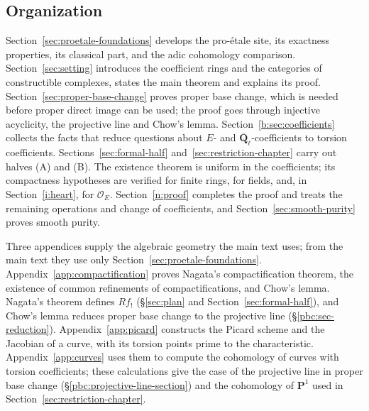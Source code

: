\documentclass[11pt,a4paper]{article}
\numberwithin{equation}{section}
\theoremstyle{definition}
\theoremstyle{remark}
\newcommand{\Qbar}{\overline{\mathbf Q}_\ell}
\newcommand{\PP}{\mathbf P}
\begin{document}
\subsection{Organization}
Section~\ref{sec:proetale-foundations} develops the pro-\'etale site,
its exactness properties, its classical part, and the adic cohomology
comparison. Section~\ref{sec:setting} introduces the coefficient rings
and the categories of constructible complexes, states the main theorem
and explains its proof. Section~\ref{sec:proper-base-change} proves
proper base change, which is needed before proper direct image can be
used; the proof goes through injective acyclicity, the projective line
and Chow's lemma. Section~\ref{b:sec:coefficients} collects the facts
that reduce questions about $E$- and $\Qbar$-coefficients to torsion
coefficients. Sections~\ref{sec:formal-half}
and~\ref{sec:restriction-chapter} carry out halves (A) and (B).
The existence theorem is uniform in the coefficients; its compactness
hypotheses are verified for finite rings, for fields, and, in
Section~\ref{i:heart}, for $\mathcal O_E$.
Section~\ref{n:proof} completes the proof and treats the remaining
operations and change of coefficients, and Section~\ref{sec:smooth-purity}
proves smooth purity.

Three appendices supply the algebraic geometry the main text uses; from
the main text they use only Section~\ref{sec:proetale-foundations}.
Appendix~\ref{app:compactification} proves Nagata's compactification
theorem, the existence of common refinements of compactifications, and
Chow's lemma. Nagata's theorem defines $Rf_!$
(\S\ref{sec:plan} and Section~\ref{sec:formal-half}), and Chow's lemma
reduces proper base change to the projective line
(\S\ref{pbc:sec-reduction}). Appendix~\ref{app:picard} constructs the
Picard scheme and the Jacobian of a curve, with its torsion points
prime to the characteristic. Appendix~\ref{app:curves} uses them to
compute the cohomology of curves with torsion coefficients; these
calculations give the case of the projective line in proper base change
(\S\ref{pbc:projective-line-section}) and the cohomology of $\PP^1$
used in Section~\ref{sec:restriction-chapter}.
\end{document}
